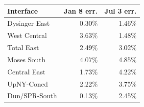 \begin{tabular}{lrr}
\toprule
Interface & Jan 8 err. & Jul 3 err. \\
\midrule
Dysinger East & 0.30\% & 1.46\% \\
West Central & 3.63\% & 1.48\% \\
Total East & 2.49\% & 3.02\% \\
Moses South & 4.07\% & 4.85\% \\
Central East & 1.73\% & 4.22\% \\
UpNY-Coned & 2.22\% & 3.75\% \\
Dun/SPR-South & 0.13\% & 2.45\% \\
\bottomrule
\end{tabular}
